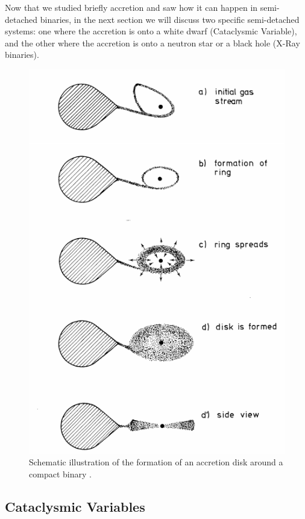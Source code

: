 Now that we studied briefly accretion and saw how it can happen in semi-detached binaries, in the next section we will discuss two specific semi-detached systems: one where the accretion is onto a white dwarf (Cataclysmic Variable), and the other where the accretion is onto a neutron star or a black hole (X-Ray binaries). 


\begin{figure}[]
        \centering
\includegraphics[scale=.3]{assets/images/accretiondisk.png}
\caption[Formation of an accretion disk]{Schematic illustration of the formation of an accretion disk around a compact binary \citep{verbunt_accretion_1982}.}
\label{fig:roche}
\end{figure}


\subsection{Cataclysmic Variables}

